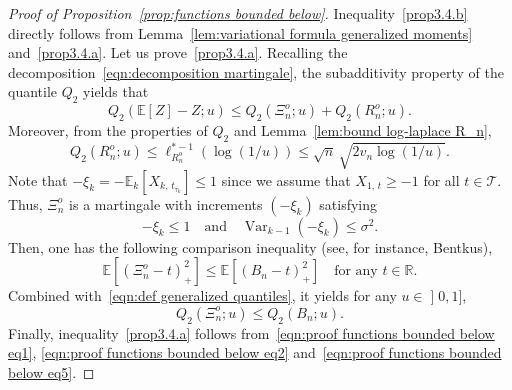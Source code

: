 \documentclass[10pt]{amsart}
\theoremstyle{definition}\newtheorem{defi}[theo]{Definition}\newtheorem{rema}[theo]{Remark}\newtheorem{exam}[theo]{Example}\newtheorem{exem}[theo]{Example}\newtheorem{nota}[theo]{Notation}
\DeclareMathOperator{\Var}{Var}
\newcommand{\bE}{\mathbb{E}}
\newcommand{\bR}{\mathbb{R}}
\newcommand{\cT}{\mathcal{T}}
\newcommand{\intervalleof}[2]{\mathopen{]} #1\mathclose{}\mathpunct{},#2\mathclose{]}}
\begin{document}
\begin{proof}[Proof of Proposition~\ref{prop:functions bounded below}]
Inequality~\eqref{prop3.4.b} directly follows from Lemma~\ref{lem:variational formula generalized moments} and~\eqref{prop3.4.a}. Let us prove~\eqref{prop3.4.a}. Recalling the decomposition~\eqref{eqn:decomposition martingale}, the subadditivity property of the quantile $Q_2$ yields that
\begin{equation}\label{eqn:proof functions bounded below eq1}
Q_2\left(\bE[Z]-Z;u\right)\leq Q_2\left(\Xi_n^o;u\right)+Q_2\left(R_n^o;u\right).
\end{equation}
Moreover, from the properties of $Q_2$ and Lemma~\ref{lem:bound log-laplace R_n},
\begin{equation}\label{eqn:proof functions bounded below eq2}
Q_2\left(R_n^o;u\right)\leq \ell_{R_n^o}^{*-1}(\log(1/u))\leq \sqrt{n}\,\sqrt{2v_n\log(1/u)}.
\end{equation}
Note that $-\xi_k=-\bE_k[X_{k,\,t_{\tau_k}}]\leq 1$ since we assume that $X_{1,\,t}\geq -1$ for all $t\in\cT$. Thus, $\Xi_n^o$ is a martingale with increments $(-\xi_k)$ satisfying
\begin{equation}\label{eqn:proof functions bounded below eq3}
-\xi_k\leq 1\quad\text{and}\quad \Var_{k-1}(-\xi_k)\leq\sigma^2.
\end{equation}
Then, one has the following comparison inequality (see, for instance, Bentkus\cite[Lemma~4.4]{Bentkus04}),
\begin{equation}\label{eqn:proof functions bounded below eq4}
\bE\left[(\Xi_n^o-t)_+^2\right]\leq\bE\left[(B_n-t)_+^2\right]\quad\text{for any }t\in\bR.
\end{equation}
Combined with~\eqref{eqn:def generalized quantiles}, it yields for any $u\in\intervalleof 01$,
\begin{equation}\label{eqn:proof functions bounded below eq5}
Q_2(\Xi_n^o;u)\leq Q_2(B_n;u).
\end{equation}
Finally, inequality~\eqref{prop3.4.a} follows from~\eqref{eqn:proof functions bounded below eq1}, \eqref{eqn:proof functions bounded below eq2} and~\eqref{eqn:proof functions bounded below eq5}.
\end{proof}
\end{document}
